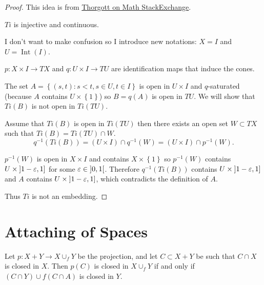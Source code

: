\begin{proof}
	This idea is from \href{https://math.stackexchange.com/a/4879627}{Thorgott on Math StackExchange}.

	\( Ti \) is injective and continuous.

	I don't want to make confusion so I introduce new notations: \( X = I \) and \( U = \operatorname{Int}(I) \).

	\( p: X \times I \to TX \) and \( q: U \times I \to TU \) are identification maps that induce the cones.

	The set \( A = \left\{ (s, t): s < t, s \in U, t \in I \right\} \) is open in \( U \times I \) and \( q \)-saturated (because \( A \) contains \( U \times \left\{ 1 \right\} \)) so \( B = q(A) \) is open in \( TU \). We will show that \( Ti(B) \) is not open in \( Ti(TU) \).

	Assume that \( Ti(B) \) is open in \( Ti(TU) \) then there exists an open set \( W \subset TX \) such that \( Ti(B) = Ti(TU) \cap W \).
	\[
		q^{-1}(Ti(B)) = (U \times I) \cap q^{-1}(W) = (U \times I) \cap p^{-1}(W).
	\]

	\( p^{-1}(W) \) is open in \( X \times I \) and contains \( X \times \left\{ 1 \right\} \) so \( p^{-1}(W) \) contains \( U \times \left\rbrack{1 - \varepsilon, 1}\right\rbrack \) for some \( \varepsilon \in \left\rbrack{0, 1}\right\lbrack \). Therefore \( q^{-1}(Ti(B)) \) contains \( U \times \left\rbrack{1 - \varepsilon, 1}\right\rbrack \) and \( A \) contains \( U \times \left\rbrack{1 - \varepsilon, 1}\right\rbrack \), which contradicts the definition of \( A \).

	Thus \( Ti \) is not an embedding.
\end{proof}

\section{Attaching of Spaces}

\begin{proposition}{6.2}
	Let \( p: X + Y \to X \cup_{f} Y \) be the projection, and let \( C \subset X + Y \) be such that \( C \cap X \) is closed in \( X \). Then \( p(C) \) is closed in \( X \cup_{f} Y \) if and only if \( (C \cap Y) \cup f(C \cap A) \) is closed in \( Y \).
\end{proposition}

